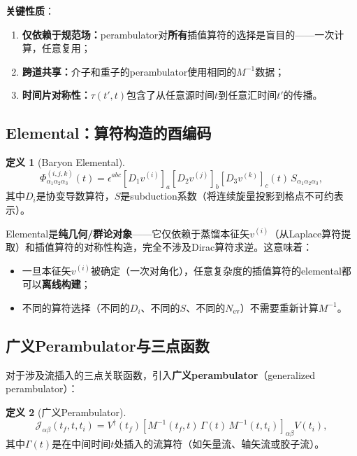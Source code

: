\documentclass[12pt,a4paper]{ctexart}
\theoremstyle{definition}
\newtheorem{definition}{定义}[section]
\begin{document}
\textbf{关键性质}：

\begin{enumerate}
    \item \textbf{仅依赖于规范场：}perambulator对\textbf{所有}插值算符的选择是盲目的——一次计算，任意复用；
    \item \textbf{跨道共享：}介子和重子的perambulator使用相同的$M^{-1}$数据；
    \item \textbf{时间片对称性：}$\tau(t',t)$包含了从任意源时间$t$到任意汇时间$t'$的传播。
\end{enumerate}

\subsection{Elemental：算符构造的酉编码}

\begin{definition}[Baryon Elemental]
\begin{equation}
\boxed{\Phi^{(i,j,k)}_{\alpha_1\alpha_2\alpha_3}(t) = \epsilon^{abc} \left[D_1 v^{(i)}\right]_a \left[D_2 v^{(j)}\right]_b \left[D_3 v^{(k)}\right]_c (t) \, S_{\alpha_1\alpha_2\alpha_3}},
\label{eq:elemental}
\end{equation}
其中$D_i$是协变导数算符，$S$是subduction系数（将连续旋量投影到格点不可约表示）。
\end{definition}

Elemental是\textbf{纯几何/群论对象}——它仅依赖于蒸馏本征矢$v^{(i)}$（从Laplace算符提取）和插值算符的对称性构造，完全不涉及Dirac算符求逆。这意味着：
\begin{itemize}
    \item 一旦本征矢$v^{(i)}$被确定（一次对角化），任意复杂度的插值算符的elemental都可以\textbf{离线构建}；
    \item 不同的算符选择（不同的$D_i$、不同的$S$、不同的$N_{\text{ev}}$）不需要重新计算$M^{-1}$。
\end{itemize}

\subsection{广义Perambulator与三点函数}

对于涉及流插入的三点关联函数，引入\textbf{广义perambulator}（generalized perambulator）\cite{Peardon2009}：

\begin{definition}[广义Perambulator]
\begin{equation}
\boxed{\mathcal{J}_{\alpha\beta}(t_f, t, t_i) = V^\dagger(t_f) \left[ M^{-1}(t_f, t) \, \Gamma(t) \, M^{-1}(t, t_i) \right]_{\alpha\beta} V(t_i)},
\label{eq:generalized_perambulator}
\end{equation}
其中$\Gamma(t)$是在中间时间$t$处插入的流算符（如矢量流、轴矢流或胶子流）。
\end{definition}
\end{document}
